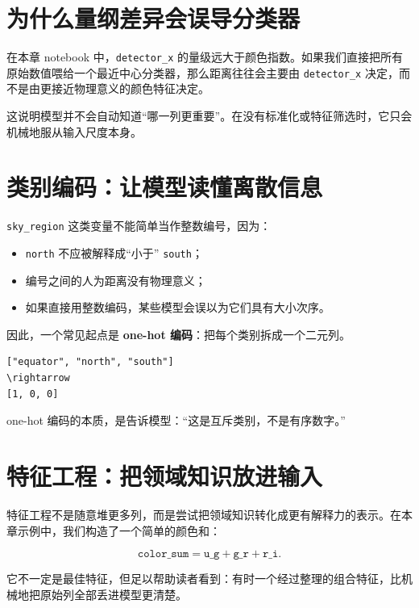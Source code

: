 \section{为什么量纲差异会误导分类器}

在本章 notebook 中，\texttt{detector\_x} 的量级远大于颜色指数。如果我们直接把所有原始数值喂给一个最近中心分类器，那么距离往往会主要由 \texttt{detector\_x} 决定，而不是由更接近物理意义的颜色特征决定。

这说明模型并不会自动知道“哪一列更重要”。在没有标准化或特征筛选时，它只会机械地服从输入尺度本身。

\section{类别编码：让模型读懂离散信息}

\texttt{sky\_region} 这类变量不能简单当作整数编号，因为：

\begin{itemize}
    \item \texttt{north} 不应被解释成“小于” \texttt{south}；
    \item 编号之间的人为距离没有物理意义；
    \item 如果直接用整数编码，某些模型会误以为它们具有大小次序。
\end{itemize}

因此，一个常见起点是 \textbf{one-hot 编码}：把每个类别拆成一个二元列。

\begin{examplebox}
\begin{lstlisting}[style=pythonstyle]
["equator", "north", "south"]
\rightarrow
[1, 0, 0]
\end{lstlisting}
\end{examplebox}

one-hot 编码的本质，是告诉模型：“这是互斥类别，不是有序数字。”

\section{特征工程：把领域知识放进输入}

特征工程不是随意堆更多列，而是尝试把领域知识转化成更有解释力的表示。在本章示例中，我们构造了一个简单的颜色和：

\[
\texttt{color\_sum} = \texttt{u\_g} + \texttt{g\_r} + \texttt{r\_i}.
\]

它不一定是最佳特征，但足以帮助读者看到：有时一个经过整理的组合特征，比机械地把原始列全部丢进模型更清楚。

